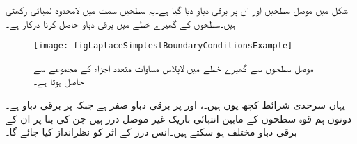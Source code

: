 شکل  میں موصل سطحیں اور ان پر برقی دباو دیا گیا ہے۔یہ سطحیں  سمت میں لامحدود لمبائی رکھتی ہیں۔سطحوں کے  گھیرے خطے میں برقی دباو حاصل کرنا درکار ہے۔

\begin{figure}
\centering
\texttt{[image: figLaplaceSimplestBoundaryConditionsExample]}
\caption{موصل سطحوں سے گھیرے خطے میں لاپلاس مساوات متعدد اجزاء کے مجموعے سے حاصل ہوتا ہے۔}
\label{شکل_لاپلاس_متعدد_اجزاء_مجموعہ}
\end{figure} 

یہاں سرحدی شرائط کچھ یوں ہیں۔،  اور  پر برقی دباو صفر ہے جبکہ  پر برقی دباو   ہے۔دونوں ہم قوہ سطحوں کے مابین انتہائی باریک غیر موصل درز ہیں جن کی بنا پر ان کے برقی دباو مختلف ہو سکتے ہیں۔انس درز کے اثر کو نظرانداز کیا جائے گا۔


